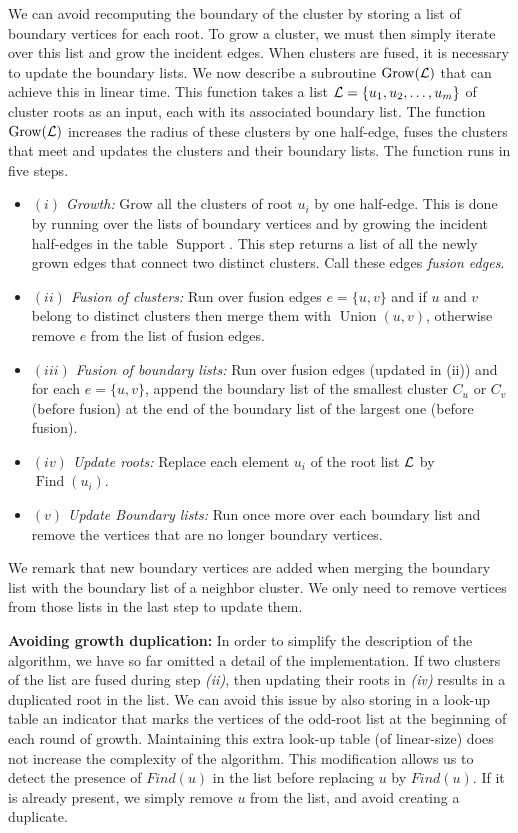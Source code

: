 \documentclass[a4paper, 10pt, accepted=2021-11-03]{quantumarticle}
\DeclareMathOperator{\Find}{Find}
\DeclareMathOperator{\Union}{Union}
\DeclareMathOperator{\Grow}{Grow}
\DeclareMathOperator{\Support}{Support}
\begin{document}
\medskip
We can avoid recomputing the boundary of the cluster by
storing a list of boundary vertices for each root. 
To grow a cluster, we must then simply iterate over this list and grow the incident edges.
When clusters are fused, it is necessary to update the boundary lists. We now describe a 
subroutine $\Grow(\cal L)$ that can achieve this in linear time. 
This function takes a list ${\cal L} = \{u_1, u_2, \dots, u_m\}$ of cluster roots as an input, 
each with its associated boundary list. The function $\Grow(\cal L)$ increases the radius of 
these clusters by one half-edge, fuses the clusters that meet and 
updates the clusters and their boundary lists.
The function runs in five steps.
{\begin{itemize}
\item 
{\em $(i)$ Growth:} Grow all the clusters of root $u_i$ by one half-edge. This is done by running over the
lists of boundary vertices and by growing the incident half-edges in the table $\Support$. 
This step returns a list of all the newly grown edges that connect two distinct clusters. 
Call these edges {\em fusion edges}.
\item 
{\em $(ii)$ Fusion of clusters:} Run over fusion edges 
$e=\{u,v\}$ and if $u$ and $v$ belong to distinct clusters then merge them with $\Union(u,v)$, otherwise remove $e$ from the list of fusion edges.
\item 
{\em $(iii)$ Fusion of boundary lists:}
Run over fusion edges (updated in (ii)) and for each $e=\{u,v\}$, 
append the boundary list of the smallest cluster $C_u$ or $C_v$ (before fusion) 
at the end of the boundary list of the largest one (before fusion).
\item
{\em $(iv)$ Update roots:} Replace each element $u_i$ of the root list $\cal L$ by $\Find(u_i)$.
\item 
{\em $(v)$ Update Boundary lists:} Run once more over each boundary list and
remove the vertices that are no longer boundary vertices.
\end{itemize}

We remark that new boundary vertices are added when merging the boundary list with the
boundary list of a neighbor cluster. We only need to remove vertices from those lists
in the last step to update them.

\medskip
{\bf Avoiding growth duplication:}
In order to simplify the description of the algorithm, we have so far omitted a detail of the implementation.
If two clusters of the list are fused during step {\em (ii)}, then updating their roots 
in {\em (iv)} results in a duplicated root in the list.
We can avoid this issue by also storing in a look-up table an indicator that marks 
the vertices of the odd-root list at the beginning of each round of growth. 
Maintaining this extra look-up table (of linear-size) does not increase the complexity of the algorithm. 
This modification allows us to detect the presence of $Find(u)$ in 
the list before replacing $u$ by $Find(u)$. If it is already present, we simply remove $u$
from the list, and avoid creating a duplicate.


}
\end{document}
